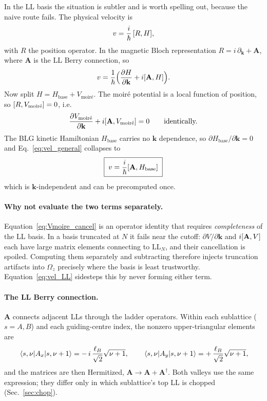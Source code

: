 \documentclass[11pt]{article}
\newcommand{\kb}{\mathbf{k}}
\newcommand{\Om}{\Omega}
\newcommand{\lB}{\ell_B}
\begin{document}
In the LL basis the situation is subtler and is worth spelling out,
because the naive route fails.  The physical velocity is
\begin{equation}
  v = \frac{i}{\hbar}\,\comm{R}{H},
\end{equation}
with $R$ the position operator.  In the magnetic Bloch representation
$R = i\,\partial_\kb + \mathbf{A}$, where $\mathbf{A}$ is the LL Berry
connection, so
\begin{equation}\label{eq:vel_general}
  v = \frac{1}{\hbar}\Bigl( \pdv{H}{\kb} + i \comm{\mathbf{A}}{H} \Bigr).
\end{equation}
Now split $H = H_{\text{base}} + V_{\text{moir\'e}}$.  The moir\'e
potential is a local function of position, so $\comm{R}{V_{\text{moir\'e}}}
= 0$, i.e.
\begin{equation}\label{eq:Vmoire_cancel}
  \pdv{V_{\text{moir\'e}}}{\kb} + i\comm{\mathbf{A}}{V_{\text{moir\'e}}} = 0
  \qquad\text{identically.}
\end{equation}
The BLG kinetic Hamiltonian $H_{\text{base}}$ carries no $\kb$
dependence, so $\partial H_{\text{base}}/\partial \kb = 0$ and
Eq.~\eqref{eq:vel_general} collapses to
\begin{equation}\label{eq:vel_LL}
  \boxed{\; v = \frac{i}{\hbar}\comm{\mathbf{A}}{H_{\text{base}}} \;}
\end{equation}
which is $\kb$-independent and can be precomputed once.

\paragraph{Why not evaluate the two terms separately.}
Equation~\eqref{eq:Vmoire_cancel} is an operator identity that requires
\emph{completeness} of the LL basis.  In a basis truncated at $N$ it
fails near the cutoff: $\partial V/\partial\kb$ and
$i\comm{\mathbf{A}}{V}$ each have large matrix elements connecting to
$\mathrm{LL}_N$, and their cancellation is spoiled.  Computing them
separately and subtracting therefore injects truncation artifacts into
$\Om_z$ precisely where the basis is least trustworthy.
Equation~\eqref{eq:vel_LL} sidesteps this by never forming either term.

\paragraph{The LL Berry connection.}
$\mathbf{A}$ connects adjacent LLs through the ladder operators.  Within
each sublattice ($s = A,B$) and each guiding-centre index, the nonzero
upper-triangular elements are
\begin{equation}\label{eq:ladder}
  \mel{s,\nu}{A_x}{s,\nu+1} = -\,i\,\frac{\lB}{\sqrt{2}}\sqrt{\nu+1},
  \qquad
  \mel{s,\nu}{A_y}{s,\nu+1} = +\,\frac{\lB}{\sqrt{2}}\sqrt{\nu+1},
\end{equation}
and the matrices are then Hermitized, $\mathbf{A} \to \mathbf{A} +
\mathbf{A}^\dagger$.  Both valleys use the same expression; they differ
only in which sublattice's top LL is chopped (Sec.~\ref{sec:chop}).
\end{document}
